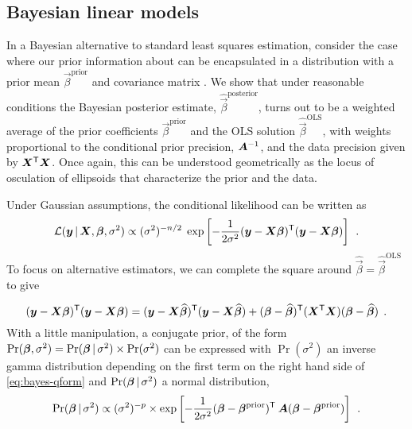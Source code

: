 \subsection{Bayesian linear models}

In a Bayesian alternative to standard least squares estimation, consider the case where our prior
information about \vec{\beta} can be encapsulated in a distribution with a prior mean
$\vec{\beta}^{\mathrm{prior}}$ and covariance matrix .  We show that under reasonable conditions
the Bayesian posterior
estimate, $\widehat{\vec{\beta}}^{\mathrm{posterior}}$, turns out
to be a weighted average of the prior coefficients $\vec{\beta}^{\mathrm{prior}}$ and the OLS solution $\widehat{\vec{\beta}}^{\mathrm{OLS}}$,
with weights proportional to the conditional prior precision, $\bm{A}^{-1}$, and the data precision given by
$\bm{X}^\mathsf{T}\bm{X}$.   Once again, this can be understood geometrically as the locus of osculation of
ellipsoids that characterize the prior and the data.

Under Gaussian assumptions,
the conditional likelihood can be written as
\begin{equation*}
\mathcal{L} (\bm{y} \, | \, \bm{X}, \bm{\beta}, \sigma^2) \propto
   (\sigma^2)^{-n/2} \; \exp \left[ -\frac{1}{2 \sigma^2} (\bm{y}-\bm{X} \bm{\beta}) ^\mathsf{T}  (\bm{y}-\bm{X} \bm{\beta})   \right] \:\: .
\end{equation*}
To focus on alternative estimators, we can complete the square around $\widehat{\vec{\beta}} = \widehat{\vec{\beta}}^{\mathrm{OLS}}$ to give

\begin{equation} \label{eq:bayes-qform}
(\bm{y}- \bm{X} \bm{\beta})^\mathsf{T}(\bm{y}- \bm{X} \bm{\beta}) =
(\bm{y}- \bm{X} \widehat{\bm{\beta}})^\mathsf{T}(\bm{y}- \bm{X} \widehat{\bm{\beta}}) +
(\bm{\beta} - \widehat{\bm{\beta}})^\mathsf{T}(\bm{X}^\mathsf{T}\bm{X})(\bm{\beta} - \widehat{\bm{\beta}}) \:\: .
\end{equation}
With a little manipulation, a conjugate prior, of the form $\Pr (\bm{\beta}, \sigma^2) = \Pr (\bm{\beta} \, | \, \sigma^2) \times \Pr (\sigma^2)$
can be expressed with $\Pr (\sigma^2)$ an inverse gamma distribution depending on the first term on the right hand side of \eqref{eq:bayes-qform}
and $\Pr (\bm{\beta} \, | \, \sigma^2)$ a normal distribution,
\begin{equation}
\Pr (\bm{\beta} \, | \, \sigma^2) \propto (\sigma^2)^{-p}  \times \exp \left[ -\frac{1}{2 \sigma^2}  (\bm{\beta} - \bm{\beta}^{\mathrm{prior}}) ^\mathsf{T}  \: \bm{A} (\bm{\beta} - \bm{\beta}^{\mathrm{prior}})  \right] \:\: .
\end{equation}

